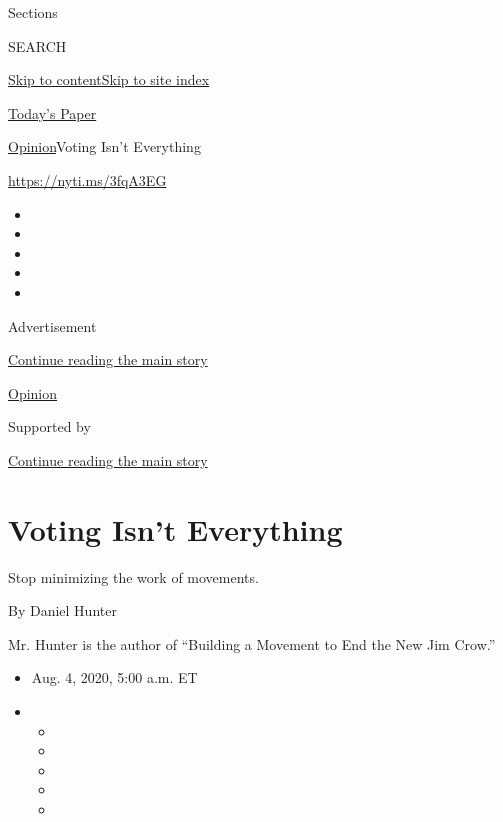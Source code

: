 Sections

SEARCH

\protect\hyperlink{site-content}{Skip to
content}\protect\hyperlink{site-index}{Skip to site index}

\href{https://myaccount.nytimes3xbfgragh.onion/auth/login?response_type=cookie\&client_id=vi}{}

\href{https://www.nytimes3xbfgragh.onion/section/todayspaper}{Today's
Paper}

\href{/section/opinion}{Opinion}\textbar{}Voting Isn't Everything

\url{https://nyti.ms/3fqA3EG}

\begin{itemize}
\item
\item
\item
\item
\item
\end{itemize}

Advertisement

\protect\hyperlink{after-top}{Continue reading the main story}

\href{/section/opinion}{Opinion}

Supported by

\protect\hyperlink{after-sponsor}{Continue reading the main story}

\hypertarget{voting-isnt-everything}{%
\section{Voting Isn't Everything}\label{voting-isnt-everything}}

Stop minimizing the work of movements.

By Daniel Hunter

Mr. Hunter is the author of ``Building a Movement to End the New Jim
Crow.''

\begin{itemize}
\item
  Aug. 4, 2020, 5:00 a.m. ET
\item
  \begin{itemize}
  \item
  \item
  \item
  \item
  \item
  \end{itemize}
\end{itemize}

